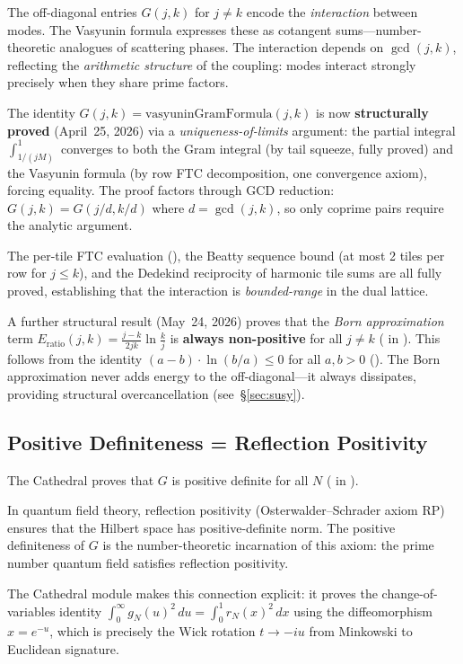 \begin{observation}[Off-Diagonal = Interaction (Structurally Proved)]
The off-diagonal entries $G(j,k)$ for $j \neq k$ encode the
\emph{interaction} between modes. The Vasyunin formula expresses these
as cotangent sums---number-theoretic analogues of scattering phases.
The interaction depends on $\gcd(j,k)$, reflecting the
\emph{arithmetic structure} of the coupling: modes interact strongly
precisely when they share prime factors.

The identity $G(j,k) = \text{vasyuninGramFormula}(j,k)$ is now
\textbf{structurally proved} (April~25, 2026) via a
\emph{uniqueness-of-limits} argument: the partial integral
$\int_{1/(jM)}^1$ converges to both the Gram integral (by tail
squeeze, fully proved) and the Vasyunin formula (by row FTC
decomposition, one convergence axiom), forcing equality. The proof
factors through GCD reduction: $G(j,k) = G(j/d, k/d)$ where
$d = \gcd(j,k)$, so only coprime pairs require the analytic argument.

The per-tile FTC evaluation (),
the Beatty sequence bound (at most 2 tiles per row for $j \leq k$),
and the Dedekind reciprocity of harmonic tile sums are all
fully proved, establishing that the interaction is
\emph{bounded-range} in the dual lattice.

A further structural result (May~24, 2026) proves that the
\emph{Born approximation} term $E_{\mathrm{ratio}}(j,k) =
\frac{j-k}{2jk}\ln\frac{k}{j}$ is \textbf{always non-positive}
for all $j \neq k$ ( in
). This follows from the identity
$(a - b) \cdot \ln(b/a) \leq 0$ for all $a, b > 0$
(). The Born approximation
never adds energy to the off-diagonal---it always dissipates,
providing structural overcancellation (see~\S\ref{sec:susy}).
\end{observation}

\subsection{Positive Definiteness = Reflection Positivity}

The Cathedral proves that $G$ is positive definite for all $N$
( in ).

\begin{principle}
In quantum field theory, reflection positivity (Osterwalder--Schrader
axiom RP) ensures that the Hilbert space has positive-definite norm.
The positive definiteness of $G$ is the number-theoretic incarnation
of this axiom: the prime number quantum field satisfies reflection
positivity.

The Cathedral module  makes this connection
explicit: it proves the change-of-variables identity
$\int_0^\infty g_N(u)^2\,du = \int_0^1 r_N(x)^2\,dx$
using the diffeomorphism $x = e^{-u}$, which is precisely the
Wick rotation $t \to -iu$ from Minkowski to Euclidean signature.
\end{principle}

